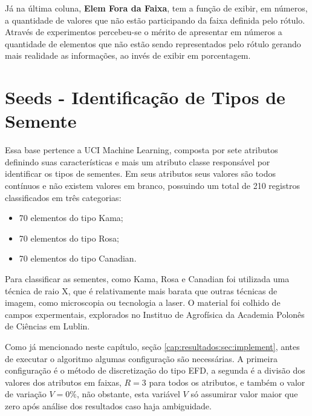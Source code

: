 Já na última coluna, \textbf{Elem Fora da Faixa}, tem a função de exibir, em números, a quantidade de valores que não estão participando da faixa definida pelo rótulo. Através de experimentos percebeu-se o mérito de apresentar em números a quantidade de elementos que não estão sendo representados pelo rótulo gerando mais realidade as informações, ao invés de exibir em porcentagem.

\section{Seeds - Identificação de Tipos de Semente}
Essa base pertence a UCI Machine Learning, composta por sete  atributos definindo suas características e mais um atributo classe  responsável por identificar os tipos de sementes. Em seus atributos  seus valores são todos contínuos e não existem valores em branco,  possuindo um total de 210 registros classificados em três categorias:
\begin{itemize}[noitemsep]
 \item 70 elementos do tipo Kama;
 \item 70 elementos do tipo Rosa;
 \item 70 elementos do tipo Canadian.
\end{itemize}
Para classificar as sementes, como Kama, Rosa e Canadian foi utilizada uma técnica de raio X, que é relativamente mais barata que outras técnicas de imagem, como microscopia ou tecnologia a laser. O material foi colhido de campos expermentais, explorados no Instituo de Agrofísica da Academia Polonês de Ciências em Lublin.

Como já mencionado neste capítulo, seção \ref{cap:resultados:sec:implement}, antes de executar o algoritmo algumas configuração são necessárias. A primeira configuração é o método de discretização do tipo EFD, a segunda é a divisão dos valores dos atributos em faixas, ${R=3}$ para todos os atributos, e também o valor de variação ${V=0\%}$,  não obstante, esta variável ${V}$ só assumirar valor maior que zero após análise dos resultados caso haja ambiguidade.


